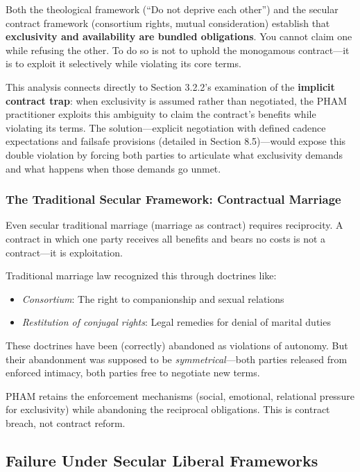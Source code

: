 \documentclass[12pt, letterpaper]{article}
\begin{document}
Both the theological framework (``Do not deprive each other'') and the secular contract framework (consortium rights, mutual consideration) establish that \textbf{exclusivity and availability are bundled obligations}. You cannot claim one while refusing the other. To do so is not to uphold the monogamous contract---it is to exploit it selectively while violating its core terms.

This analysis connects directly to Section 3.2.2's examination of the \textbf{implicit contract trap}: when exclusivity is assumed rather than negotiated, the PHAM practitioner exploits this ambiguity to claim the contract's benefits while violating its terms. The solution---explicit negotiation with defined cadence expectations and failsafe provisions (detailed in Section 8.5)---would expose this double violation by forcing both parties to articulate what exclusivity demands and what happens when those demands go unmet.

\subsubsection{The Traditional Secular Framework: Contractual Marriage}

Even secular traditional marriage (marriage as contract) requires reciprocity. A contract in which one party receives all benefits and bears no costs is not a contract---it is exploitation.

Traditional marriage law recognized this through doctrines like:
\begin{itemize}
    \item \textit{Consortium}: The right to companionship and sexual relations
    \item \textit{Restitution of conjugal rights}: Legal remedies for denial of marital duties
\end{itemize}

These doctrines have been (correctly) abandoned as violations of autonomy. But their abandonment was supposed to be \textit{symmetrical}---both parties released from enforced intimacy, both parties free to negotiate new terms.

PHAM retains the enforcement mechanisms (social, emotional, relational pressure for exclusivity) while abandoning the reciprocal obligations. This is contract breach, not contract reform.

\subsection{Failure Under Secular Liberal Frameworks}
\end{document}
